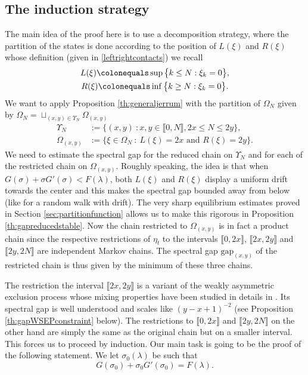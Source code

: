 \documentclass[reqno,11pt]{amsart}
\numberwithin{equation}{section}
\newcommand{\gO}{\Omega}
\newcommand{\gl}{\lambda}
\newcommand{\lint}{\llbracket}
\newcommand{\rint}{\rrbracket}
\newcommand{\Gap}{\mathrm{gap}}
\begin{document}
\subsection{The induction strategy}

 The main idea of the proof here is to use a decomposition strategy,
where the partition of the states is done according to the position of $L(\xi)$ and $R(\xi)$
 whose definition (given in \eqref{leftrightcontacts}) we recall 
 \begin{equation}
\begin{gathered}
L(\xi) \colonequals \sup \big\{k\leq N: \xi_k=0  \big\},\\
R(\xi) \colonequals \inf \big\{k\geq N: \xi_k=0 \big\}.
\end{gathered}
\end{equation}
We want to apply Proposition \ref{th:generaljerrum} with the partition of $\gO_N$ given by
 $\gO_N= \sqcup_{(x,y)\in \Upsilon_N} \gO_{(x,y)}$
\begin{equation}\label{inductspace}
\begin{split}
\Upsilon_N&:=\{ (x,y) \ : x,y\in \lint 0,N\rint, 2x\le N \le 2y \},\\
\gO_{(x,y)}&:=\{ \xi\in \gO_N \ :  \ L(\xi)=2x \text{ and } R(\xi)=2y \}.
\end{split}
\end{equation}
We need to estimate the spectral gap for the  reduced chain on $\Upsilon_N$ and for each of the restricted chain on $\gO_{(x,y)}$. Roughly speaking, the idea is that when $G(\sigma)+\sigma G'(\sigma)<F(\gl)$, both $L(\xi)$ and $R(\xi)$ display a uniform drift towards the center and this makes the spectral gap bounded away from below (like for a random walk with drift). The very sharp equilibrium estimates proved in Section \ref{sec:partitionfunction} allows us to make this rigorous in Proposition \ref{th:gapreducedstable}.
Now the chain restricted to $\gO_{(x,y)}$ is in fact a product chain since the  respective restrictions of $\eta_t$ to the intervals $\lint 0, 2x \rint$, $\lint 2x, 2y\rint$ and $\lint 2y, 2N \rint$ are independent Markov chains. The spectral gap $\Gap_{(x,y)}$ of the restricted chain is thus given by the minimum of these three chains.

\medskip


The restriction the interval $\lint 2x, 2y \rint$ is a variant of the weakly asymmetric exclusion process whose mixing properties have been studied in details in \cite{labbe2018mixing}. Its spectral gap is well understood and scales like $(y-x+1)^{-2}$ (see Proposition \ref{th:gapWSEPconstraint} below).
The restrictions to $\lint 0, 2x \rint$ and $\lint 2y, 2N \rint$ on the other hand are simply the same as the original chain but on a smaller interval. This forces us to proceed by induction.
Our main task is going to be the proof of the following statement.
We let $\sigma_0(\gl)$ be such that  
\begin{equation}\label{defsig0}
G(\sigma_0)+\sigma_0 G'(\sigma_0)=F(\gl).
\end{equation}
\end{document}
